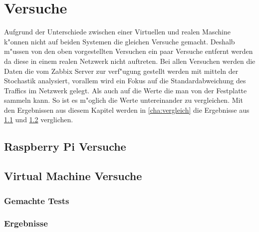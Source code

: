 \chapter{Versuche}
\label{cha:versuche}
Aufgrund der Unterschiede zwischen einer Virtuellen und realen Maschine k"onnen nicht auf beiden Systemen  %
die gleichen Versuche gemacht. Deshalb m"ussen von den oben vorgestellten Versuchen ein paar Versuche entfernt %
werden da diese in einem realen Netzwerk nicht auftreten. Bei allen Versuchen werden die Daten die vom Zabbix Server %
zur verf"ugung gestellt werden mit mitteln der Stochastik analysiert, vorallem wird ein Fokus auf die Standardabweichung des Traffics %
im Netzwerk gelegt. Als auch auf die Werte die man von der Festplatte sammeln kann. %
So ist es m"oglich die Werte untereinander zu vergleichen. Mit den Ergebnissen %
aus diesem Kapitel werden in \cref{cha:vergleich} die Ergebnisse aus \cref{sec:raspberryPiVersuche} und \cref{sec:VMVersuche} verglichen. %

\section{Raspberry Pi Versuche}
\label{sec:raspberryPiVersuche}





\section{Virtual Machine Versuche}
\label{sec:VMVersuche}
\subsection{Gemachte Tests}
\subsection{Ergebnisse}


